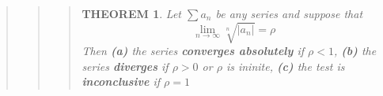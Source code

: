 \documentclass{report}
\newtheorem{theorem}{THEOREM}
\begin{document}
\begin{quote}
\begin{quote}
		\begin{quote}
			\begin{theorem}

				Let $\sum a_n$ be any series and suppose that
				$$\lim_{n \to \infty } \sqrt[n]{\left | a_n \right |} = \rho$$
				Then \textbf{(a)} the series \textbf{converges absolutely} if $\rho < 1$, \textbf{(b)} the series \textbf{diverges} if $ \rho > 0 $ or $\rho$ is ininite, \textbf{(c)} the test is \textbf{inconclusive} if $\rho = 1$
			
			\end{theorem}
		\end{quote}

	\end{quote}

\end{quote}

\end{document}
